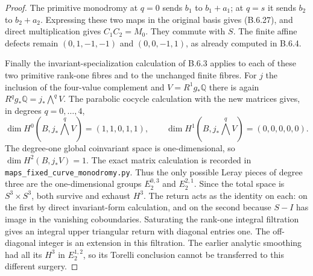 \begin{proof}
The primitive monodromy at $q=0$ sends $b_1$ to $b_1+a_1$;
at $q=s$ it sends $b_2$ to $b_2+a_2$.  Expressing these two maps
in the original basis gives (B.6.27), and direct multiplication
gives $C_1C_2=M_0$.  They commute with $S$.  The finite affine
defects remain $(0,1,-1,-1)$ and $(0,0,-1,1)$, as already
computed in B.6.4.

Finally the invariant-specialization calculation of B.6.3 applies
to each of these two primitive rank-one fibres and to the unchanged
finite fibres.  For $j$ the inclusion of the four-value complement
and $V=R^1g_*\mathbb Q$ there is again
$R^qg_*\mathbb Q=j_*\bigwedge^qV$.  The parabolic cocycle
calculation with the new matrices gives, in degrees $q=0,\ldots,4$,
\[
 \dim H^0(B,j_*\bigwedge^qV)=(1,1,0,1,1),\qquad
 \dim H^1(B,j_*\bigwedge^qV)=(0,0,0,0,0).
\]
The degree-one global coinvariant space is one-dimensional, so
$\dim H^2(B,j_*V)=1$.  The exact matrix calculation is recorded
in \texttt{maps\_fixed\_curve\_monodromy.py}.  Thus the only
possible Leray pieces of degree three are the one-dimensional
groups $E_2^{0,3}$ and $E_2^{2,1}$.  Since the total space is
$S^3\times S^3$, both survive and exhaust $H^3$.  The return acts
as the identity on each: on the first by direct invariant-form
calculation, and on the second because $S-I$ has image in the
vanishing coboundaries.  Saturating the rank-one integral
filtration gives an integral upper triangular return with
diagonal entries one.  The off-diagonal integer is an extension
in this filtration.  The earlier analytic smoothing had all its
$H^3$ in $E_2^{1,2}$, so its Torelli conclusion cannot be
transferred to this different surgery.
\end{proof}




